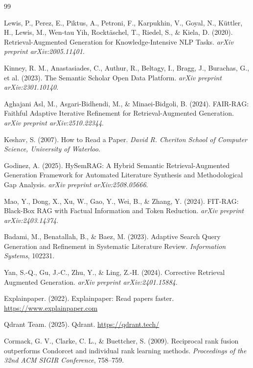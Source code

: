 \documentclass[12pt,a4paper]{report}
\begin{document}
\begin{thebibliography}{99}

Lewis, P., Perez, E., Piktus, A., Petroni, F., Karpukhin, V., Goyal, N.,
Küttler, H., Lewis, M., Wen-tau Yih, Rocktäschel, T., Riedel, S., \& Kiela, D.
(2020). Retrieval-Augmented Generation for Knowledge-Intensive NLP Tasks.
\textit{arXiv preprint arXiv:2005.11401}.

Kinney, R. M., Anastasiades, C., Authur, R., Beltagy, I., Bragg, J.,
Burachas, G., et al. (2023). The Semantic Scholar Open Data Platform.
\textit{arXiv preprint arXiv:2301.10140}.

Aghajani Asl, M., Asgari-Bidhendi, M., \& Minaei-Bidgoli, B. (2024).
FAIR-RAG: Faithful Adaptive Iterative Refinement for Retrieval-Augmented
Generation. \textit{arXiv preprint arXiv:2510.22344}.

Keshav, S. (2007). How to Read a Paper. \textit{David R. Cheriton School of
Computer Science, University of Waterloo}.

Godinez, A. (2025). HySemRAG: A Hybrid Semantic Retrieval-Augmented Generation
Framework for Automated Literature Synthesis and Methodological Gap Analysis.
\textit{arXiv preprint arXiv:2508.05666}.

Mao, Y., Dong, X., Xu, W., Gao, Y., Wei, B., \& Zhang, Y. (2024). FIT-RAG:
Black-Box RAG with Factual Information and Token Reduction. \textit{arXiv
preprint arXiv:2403.14374}.

Badami, M., Benatallah, B., \& Baez, M. (2023). Adaptive Search Query
Generation and Refinement in Systematic Literature Review. \textit{Information
Systems}, 102231.

Yan, S.-Q., Gu, J.-C., Zhu, Y., \& Ling, Z.-H. (2024). Corrective Retrieval
Augmented Generation. \textit{arXiv preprint arXiv:2401.15884}.

Explainpaper. (2022). Explainpaper: Read papers faster.
\url{https://www.explainpaper.com}

Qdrant Team. (2025). Qdrant. \url{https://qdrant.tech/}

Cormack, G. V., Clarke, C. L., \& Buettcher, S. (2009). Reciprocal rank fusion
outperforms Condorcet and individual rank learning methods. \textit{Proceedings
of the 32nd ACM SIGIR Conference}, 758--759.


\end{thebibliography}
\end{document}
